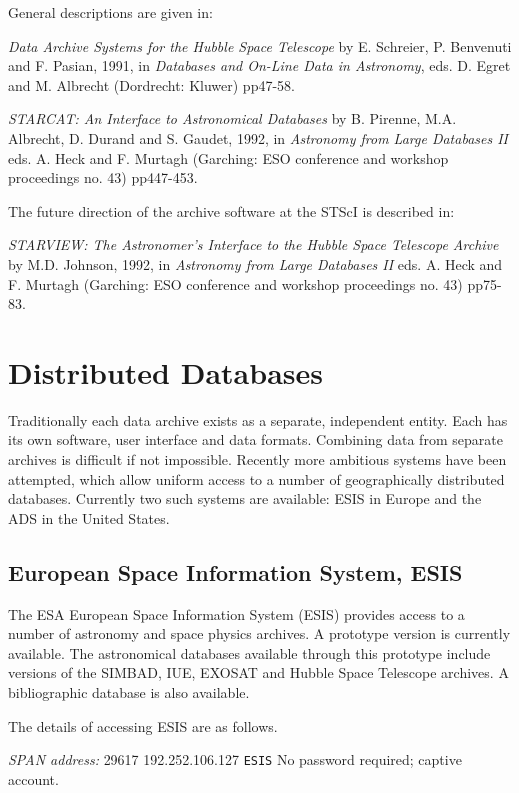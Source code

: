 \documentclass[twoside,11pt]{article}
\newcommand{\xlabel}[1]{}
\begin{document}
General descriptions are given in:

{\it Data Archive Systems for the Hubble Space Telescope} by E. 
Schreier, P. Benvenuti and F. Pasian, 1991, in {\it Databases and 
On-Line Data in Astronomy}, eds. D. Egret and M. Albrecht (Dordrecht: 
Kluwer) pp47-58.

{\it STARCAT: An Interface to Astronomical Databases} by B. Pirenne,
M.A. Albrecht, D. Durand and S. Gaudet, 1992, in {\it Astronomy from 
Large Databases II} eds. A. Heck and F. Murtagh (Garching: ESO 
conference and workshop proceedings no. 43) pp447-453.

The future direction of the archive software at the STScI is described 
in:

{\it STARVIEW: The Astronomer's Interface to the Hubble Space Telescope
Archive} by M.D. Johnson, 1992, in {\it Astronomy from Large Databases 
II} eds. A. Heck and F. Murtagh (Garching: ESO conference and workshop 
proceedings no. 43) pp75-83.


\section{Distributed Databases\xlabel{distributed_databases}}

Traditionally each data archive exists as a separate, independent
entity. Each has its own software, user interface and data formats.
Combining data from separate archives is difficult if not impossible.
Recently more ambitious systems have been attempted, which allow 
uniform access to a number of geographically distributed databases.
Currently two such systems are available: ESIS in Europe and the ADS
in the United States.

\subsection{European Space Information System, ESIS
\xlabel{european_space_information_system_esis}}

The ESA European Space Information System (ESIS) provides access to a
number of astronomy and space physics archives. A prototype version
is currently available. The astronomical databases available through
this prototype include versions of the SIMBAD, IUE, EXOSAT and Hubble
Space Telescope archives. A bibliographic database is also available.

The details of accessing ESIS are as follows.

{\it SPAN address: } 29617
 192.252.106.127
 \verb-ESIS-
 No password required; captive account.
\end{document}
